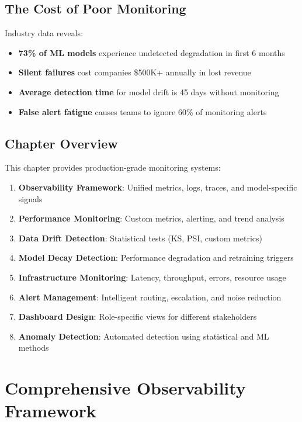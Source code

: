 \subsection{The Cost of Poor Monitoring}

Industry data reveals:
\begin{itemize}
    \item \textbf{73\% of ML models} experience undetected degradation in first 6 months
    \item \textbf{Silent failures} cost companies \$500K+ annually in lost revenue
    \item \textbf{Average detection time} for model drift is 45 days without monitoring
    \item \textbf{False alert fatigue} causes teams to ignore 60\% of monitoring alerts
\end{itemize}

\subsection{Chapter Overview}

This chapter provides production-grade monitoring systems:

\begin{enumerate}
    \item \textbf{Observability Framework}: Unified metrics, logs, traces, and model-specific signals
    \item \textbf{Performance Monitoring}: Custom metrics, alerting, and trend analysis
    \item \textbf{Data Drift Detection}: Statistical tests (KS, PSI, custom metrics)
    \item \textbf{Model Decay Detection}: Performance degradation and retraining triggers
    \item \textbf{Infrastructure Monitoring}: Latency, throughput, errors, resource usage
    \item \textbf{Alert Management}: Intelligent routing, escalation, and noise reduction
    \item \textbf{Dashboard Design}: Role-specific views for different stakeholders
    \item \textbf{Anomaly Detection}: Automated detection using statistical and ML methods
\end{enumerate}

\section{Comprehensive Observability Framework}

